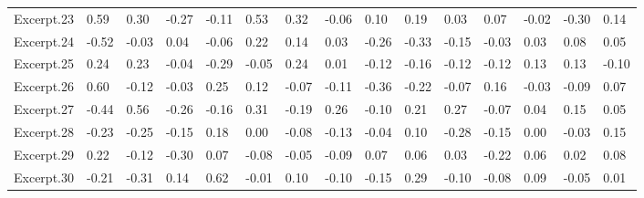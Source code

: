 \documentclass[
]{article}
\newenvironment{lltable}{\begin{landscape}\begin{center}\begin{ThreePartTable}}{\end{ThreePartTable}\end{center}\end{landscape}}
\begin{document}
\begin{lltable}
{\begin{longtable}{lllllllllllllll}
Excerpt.23 & 0.59 & 0.30 & -0.27 & -0.11 & 0.53 & 0.32 & -0.06 & 0.10 & 0.19 & 0.03 & 0.07 & -0.02 & -0.30 & 0.14\\
Excerpt.24 & -0.52 & -0.03 & 0.04 & -0.06 & 0.22 & 0.14 & 0.03 & -0.26 & -0.33 & -0.15 & -0.03 & 0.03 & 0.08 & 0.05\\
Excerpt.25 & 0.24 & 0.23 & -0.04 & -0.29 & -0.05 & 0.24 & 0.01 & -0.12 & -0.16 & -0.12 & -0.12 & 0.13 & 0.13 & -0.10\\
Excerpt.26 & 0.60 & -0.12 & -0.03 & 0.25 & 0.12 & -0.07 & -0.11 & -0.36 & -0.22 & -0.07 & 0.16 & -0.03 & -0.09 & 0.07\\
Excerpt.27 & -0.44 & 0.56 & -0.26 & -0.16 & 0.31 & -0.19 & 0.26 & -0.10 & 0.21 & 0.27 & -0.07 & 0.04 & 0.15 & 0.05\\
Excerpt.28 & -0.23 & -0.25 & -0.15 & 0.18 & 0.00 & -0.08 & -0.13 & -0.04 & 0.10 & -0.28 & -0.15 & 0.00 & -0.03 & 0.15\\
Excerpt.29 & 0.22 & -0.12 & -0.30 & 0.07 & -0.08 & -0.05 & -0.09 & 0.07 & 0.06 & 0.03 & -0.22 & 0.06 & 0.02 & 0.08\\
Excerpt.30 & -0.21 & -0.31 & 0.14 & 0.62 & -0.01 & 0.10 & -0.10 & -0.15 & 0.29 & -0.10 & -0.08 & 0.09 & -0.05 & 0.01\\
\bottomrule
\end{longtable}

}

\end{lltable}
\end{document}
